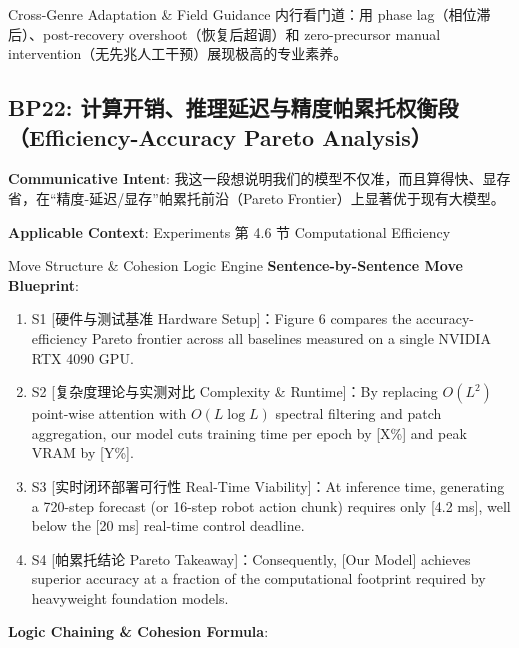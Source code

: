 \endgroup
\vspace{4pt}
\begin{TipBox}{Cross-Genre Adaptation \& Field Guidance}
内行看门道：用 phase lag（相位滞后）、post-recovery overshoot（恢复后超调）和 zero-precursor manual intervention（无先兆人工干预）展现极高的专业素养。
\end{TipBox}
\vspace{8pt}
\subsection{BP22: 计算开销、推理延迟与精度帕累托权衡段（Efficiency-Accuracy Pareto Analysis）}\label{sec:bp:BP22}
\noindent\textbf{\color{AcadNavy}Communicative Intent}: 我这一段想说明我们的模型不仅准，而且算得快、显存省，在“精度-延迟/显存”帕累托前沿（Pareto Frontier）上显著优于现有大模型。\par\vspace{2pt}
\noindent\textbf{\color{AcadSlate}Applicable Context}: Experiments 第 4.6 节 Computational Efficiency\par\vspace{4pt}
\begin{ConceptBox}{Move Structure \& Cohesion Logic Engine}
\textbf{Sentence-by-Sentence Move Blueprint}:
\begin{enumerate}[label=\textbf{\color{AcadNavy}S\arabic*.}, leftmargin=2em, itemsep=2pt]
  \item S1 [硬件与测试基准 Hardware Setup]：Figure 6 compares the accuracy-efficiency Pareto frontier across all baselines measured on a single NVIDIA RTX 4090 GPU.
  \item S2 [复杂度理论与实测对比 Complexity \& Runtime]：By replacing $O(L^2)$ point-wise attention with $O(L \log L)$ spectral filtering and patch aggregation, our model cuts training time per epoch by [X\%] and peak VRAM by [Y\%].
  \item S3 [实时闭环部署可行性 Real-Time Viability]：At inference time, generating a 720-step forecast (or 16-step robot action chunk) requires only [4.2 ms], well below the [20 ms] real-time control deadline.
  \item S4 [帕累托结论 Pareto Takeaway]：Consequently, [Our Model] achieves superior accuracy at a fraction of the computational footprint required by heavyweight foundation models.
\end{enumerate}\par\vspace{4pt}
\textbf{Logic Chaining \& Cohesion Formula}:\par{}
\end{ConceptBox}
